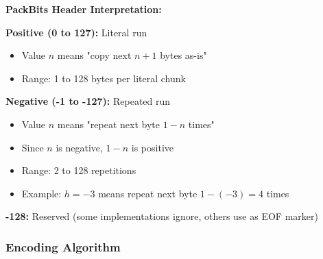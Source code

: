 \begin{importantbox}
\textbf{PackBits Header Interpretation:}

\textbf{Positive (0 to 127):} Literal run
\begin{itemize}
    \item Value $n$ means "copy next $n+1$ bytes as-is"
    \item Range: 1 to 128 bytes per literal chunk
\end{itemize}

\textbf{Negative (-1 to -127):} Repeated run
\begin{itemize}
    \item Value $n$ means "repeat next byte $1-n$ times"
    \item Since $n$ is negative, $1-n$ is positive
    \item Range: 2 to 128 repetitions
    \item Example: $h = -3$ means repeat next byte $1-(-3) = 4$ times
\end{itemize}

\textbf{-128:} Reserved (some implementations ignore, others use as EOF marker)
\end{importantbox}

\subsubsection{Encoding Algorithm}

